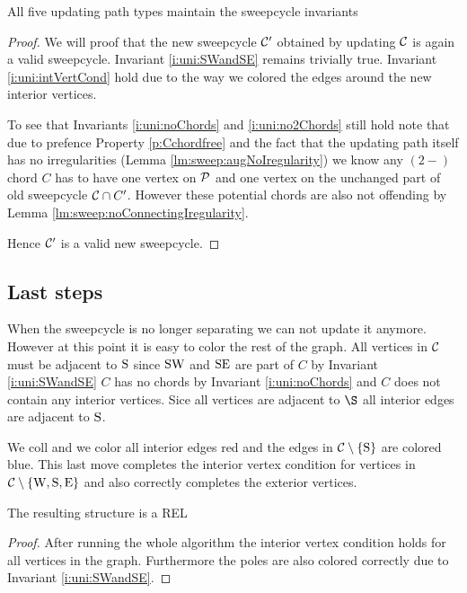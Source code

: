     \begin{lemma}
      All five updating path types maintain the sweepcycle invariants
    \end{lemma}
    \begin{proof}
      We will proof that the new sweepcycle $\C'$ obtained by updating $\C$ is again a valid sweepcycle. Invariant \ref{i:uni:SWandSE} remains trivially true. Invariant \ref{i:uni:intVertCond} hold due to the way we colored the edges around the new interior vertices.

      To see that Invariants \ref{i:uni:noChords} and \ref{i:uni:no2Chords} still hold note that due to prefence Property \ref{p:Cchordfree} and the fact that the updating path itself has no irregularities (Lemma \ref{lm:sweep:augNoIregularity})
      we know any $(2-)$chord $C$ has to have one vertex on $\P$ and one vertex on the unchanged part of old sweepcycle $\C \cap C'$. However these potential chords are also not offending by Lemma \ref{lm:sweep:noConnectingIregularity}.

      Hence $\C'$ is a valid new sweepcycle.
    \end{proof}

    \subsection{Last steps}
    When the sweepcycle is no longer separating we can not update it anymore. However at this point it is easy to color the rest of the graph. All vertices in $\C$ must be adjacent to $\pS$ since $\pS \pW$ and $\pS \pE$ are part of $C$ by Invariant \ref{i:uni:SWandSE} $C$ has no chords by Invariant \ref{i:uni:noChords} and $C$ does not contain any interior vertices. Sice all vertices are adjacent to $\S$ all interior edges are adjacent to $\pS$.

    We coll and we color all interior edges red and the edges in $\cpath$ are colored blue. This last move completes the interior vertex condition for vertices in $\C \sm {\pW, \pS, \pE}$ and also correctly completes the exterior vertices.


    \begin{lemma}
      \label{lm:sweep:REL}
      The resulting structure is a REL
    \end{lemma}

    \begin{proof}
      After running the whole algorithm the interior vertex condition holds for all vertices in the graph. Furthermore the poles are also colored correctly due to Invariant \ref{i:uni:SWandSE}.
    \end{proof}

